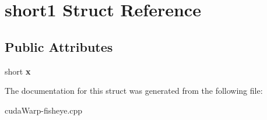 \hypertarget{structshort1}{}\section{short1 Struct Reference}
\label{structshort1}
\subsection*{Public Attributes}
\begin{DoxyCompactItemize}
\item 
short {\bfseries x}\hypertarget{structshort1_a781c67e7616a5c8607a7bfcb4be245a9}{}\label{structshort1_a781c67e7616a5c8607a7bfcb4be245a9}

\end{DoxyCompactItemize}


The documentation for this struct was generated from the following file\+:\begin{DoxyCompactItemize}
\item 
cuda\+Warp-\/fisheye.\+cpp\end{DoxyCompactItemize}
